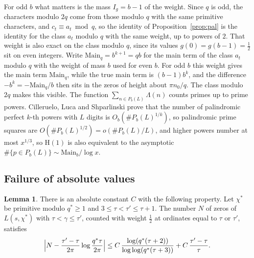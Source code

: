 \documentclass[11pt]{amsart}
\theoremstyle{definition}
\newtheorem{lemma}[theorem]{Lemma}
\numberwithin{equation}{section}
\newcommand{\Main}{\mathrm{Main}}
\begin{document}
For odd $b$ what matters is the mass $I_g=b-1$ of the weight. Since $q$ is odd, the characters modulo $2q$ come from those modulo $q$ with the same primitive characters, and $c_t\equiv a_t\bmod q$, so the identity of Proposition~\ref{prop:pal} is the identity for the class $a_t$ modulo $q$ with the same weight, up to powers of $2$. That weight is also exact on the class modulo $q$, since its values $g(0)=g(b-1)=\frac12$ sit on even integers. Write $\Main_q=b^{k+1}=qb$ for the main term of the class $a_t$ modulo $q$ with the weight of mass $b$ used for even $b$. For odd $b$ this weight gives the main term $\Main_q$, while the true main term is $(b-1)b^k$, and the difference $-b^k=-\Main_q/b$ then sits in the zeros of height about $\pi n_0/q$. The class modulo $2q$ makes this visible. The function $\sum_{n\in P_b(L)}\Lambda(n)$ counts primes up to prime powers. Cilleruelo, Luca and Shparlinski \cite{CLS} prove that the number of palindromic perfect $k$-th powers with $L$ digits is $O_b(\#P_b(L)^{1/k})$, so palindromic prime squares are $O(\#P_b(L)^{1/2})=o(\#P_b(L)/L)$, and higher powers number at most $x^{1/3}$, so $\mathrm{H}(1)$ is also equivalent to the asymptotic $\#\{p\in P_b(L)\}\sim\Main_b/\log x$.

\subsection{Failure of absolute values}

\begin{lemma}\label{lem:window}
There is an absolute constant $C$ with the following property. Let $\chi^*$ be primitive modulo $q^*\ge1$ and $3\le\tau<\tau'\le\tau+1$. The number $N$ of zeros of $L(s,\chi^*)$ with $\tau<\gamma\le\tau'$, counted with weight $\frac12$ at ordinates equal to $\tau$ or $\tau'$, satisfies
\[
\Bigl|N-\frac{\tau'-\tau}{2\pi}\log\frac{q^*\tau}{2\pi}\Bigr|\le C\,\frac{\log(q^*(\tau+2))}{\log\log(q^*(\tau+3))}+C\,\frac{\tau'-\tau}{\tau}.
\]
\end{lemma}
\end{document}
